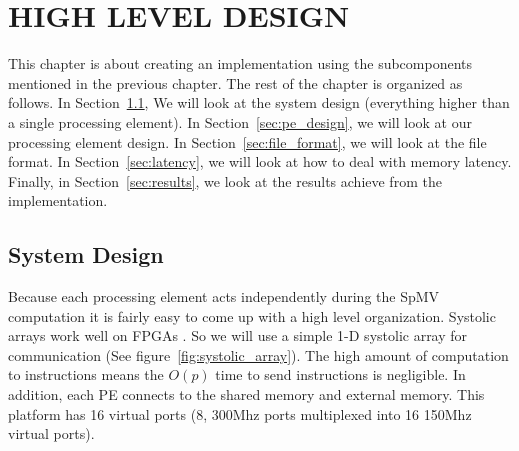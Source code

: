 \chapter{HIGH LEVEL DESIGN}
\label{chp:high_level_design}
This chapter is about creating an implementation using the subcomponents mentioned in the previous chapter. The rest of the chapter is organized as follows. In Section~\ref{sec:system_design}, We will look at the system design (everything higher than a single processing element). In Section~\ref{sec:pe_design}, we will look at our processing element design. In Section~\ref{sec:file_format}, we will look at the file format. In Section~\ref{sec:latency}, we will look at how to deal with memory latency. Finally, in Section~\ref{sec:results}, we look at the results achieve from the implementation.
\section{System Design}
\label{sec:system_design}
Because each processing element acts independently during the SpMV computation it is fairly easy to come up with a high level organization. Systolic arrays work well on FPGAs \cite{prelim:johnson}. So we will use a simple 1-D systolic array for communication (See figure~\ref{fig:systolic_array}). The high amount of computation to instructions means the $O(p)$ time to send instructions is negligible. In addition, each PE connects to the shared memory and external memory. This platform has 16 virtual ports (8, 300Mhz ports multiplexed into 16 150Mhz virtual ports).
